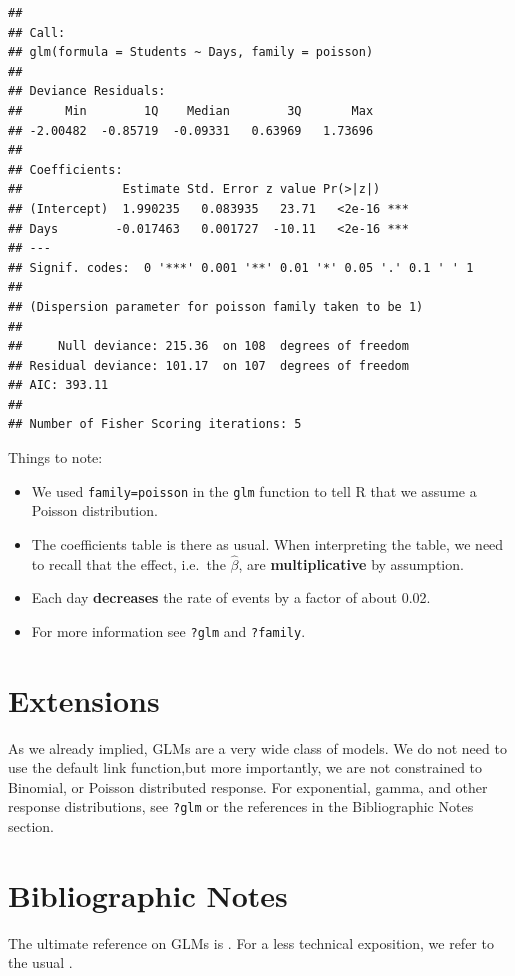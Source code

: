 \documentclass[]{book}
\providecommand{\tightlist}{%
  \setlength{\itemsep}{0pt}\setlength{\parskip}{0pt}}
\theoremstyle{definition}
\theoremstyle{definition}
\theoremstyle{remark}
\begin{document}
\begin{verbatim}
## 
## Call:
## glm(formula = Students ~ Days, family = poisson)
## 
## Deviance Residuals: 
##      Min        1Q    Median        3Q       Max  
## -2.00482  -0.85719  -0.09331   0.63969   1.73696  
## 
## Coefficients:
##              Estimate Std. Error z value Pr(>|z|)    
## (Intercept)  1.990235   0.083935   23.71   <2e-16 ***
## Days        -0.017463   0.001727  -10.11   <2e-16 ***
## ---
## Signif. codes:  0 '***' 0.001 '**' 0.01 '*' 0.05 '.' 0.1 ' ' 1
## 
## (Dispersion parameter for poisson family taken to be 1)
## 
##     Null deviance: 215.36  on 108  degrees of freedom
## Residual deviance: 101.17  on 107  degrees of freedom
## AIC: 393.11
## 
## Number of Fisher Scoring iterations: 5
\end{verbatim}

Things to note:

\begin{itemize}
\tightlist
\item
  We used \texttt{family=poisson} in the \texttt{glm} function to tell R
  that we assume a Poisson distribution.
\item
  The coefficients table is there as usual. When interpreting the table,
  we need to recall that the effect, i.e.~the \(\hat \beta\), are
  \textbf{multiplicative} by assumption.
\item
  Each day \textbf{decreases} the rate of events by a factor of about
  0.02.
\item
  For more information see \texttt{?glm} and \texttt{?family}.
\end{itemize}

\section{Extensions}\label{extensions}

As we already implied, GLMs are a very wide class of models. We do not
need to use the default link function,but more importantly, we are not
constrained to Binomial, or Poisson distributed response. For
exponential, gamma, and other response distributions, see \texttt{?glm}
or the references in the Bibliographic Notes section.

\section{Bibliographic Notes}\label{bibliographic-notes-4}

The ultimate reference on GLMs is \citet{mccullagh1984generalized}. For
a less technical exposition, we refer to the usual
\citet{venables2013modern}.
\end{document}

